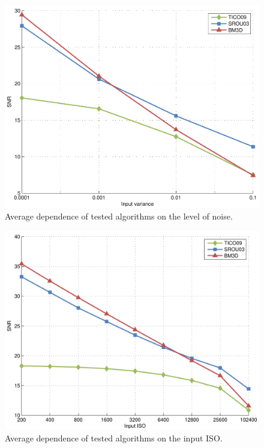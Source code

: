 \documentclass[12pt,notitlepage]{report}
\begin{document}
\begin{figure}[htb]
 \centering
  \includegraphics[width=12cm]{avg_methods_vs_var.pdf}
 \caption{Average dependence of tested algorithms on the level of noise.}
 \label{fig:avg_methods_vs_var}
\end{figure}

\begin{figure}[htb]
 \centering
  \includegraphics[width=12cm]{avg_methods_vs_ISO.pdf}
 \caption{Average dependence of tested algorithms on the input ISO.}
 \label{fig:avg_methods_vs_ISO}
\end{figure}
\end{document}

